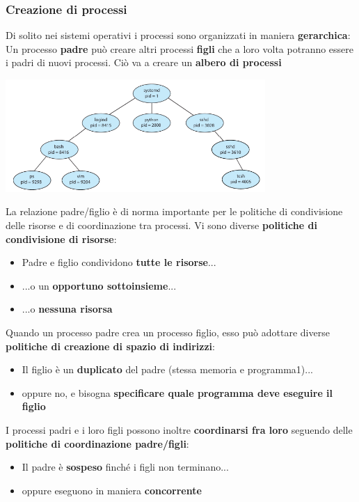 \documentclass[12pt]{article}
\begin{document}
\subsubsection{Creazione di processi}
Di solito nei sistemi operativi i processi sono organizzati in maniera \textbf{gerarchica}:
Un processo \textbf{padre} può creare altri processi \textbf{figli} che a loro volta potranno essere i padri di nuovi processi.
Ciò va a creare un \textbf{albero di processi}
\begin{center}
    \includegraphics[width = 0.74\textwidth]{Images/11.PNG}
\end{center}
La relazione padre/figlio è di norma importante per le politiche di condivisione delle risorse e di coordinazione tra processi.
Vi sono diverse \textbf{politiche di condivisione di risorse}:
\begin{itemize}
    \item Padre e figlio condividono \textbf{tutte le risorse}...
    \item ...o un \textbf{opportuno sottoinsieme}...
    \item ...o \textbf{nessuna risorsa}
\end{itemize}
Quando un processo padre crea un processo figlio, esso può adottare diverse \textbf{politiche di creazione di spazio di indirizzi}:
\begin{itemize}
    \item Il figlio è un \textbf{duplicato} del padre (stessa memoria e programma1)...
    \item oppure no, e bisogna \textbf{specificare quale programma deve eseguire il figlio}
\end{itemize}
I processi padri e i loro figli possono inoltre \textbf{coordinarsi fra loro} seguendo delle \textbf{politiche di coordinazione padre/figli}:
\begin{itemize}
    \item Il padre è \textbf{sospeso} finché i figli non terminano...
    \item oppure eseguono in maniera \textbf{concorrente}
\end{itemize}
\end{document}
